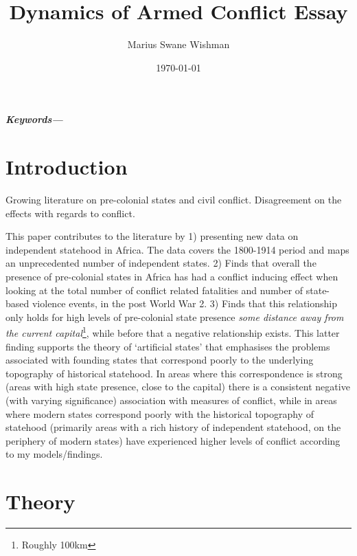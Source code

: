 \documentclass[12pt]{article}
\title{Dynamics of Armed Conflict Essay}
\author[1]{Marius Swane Wishman}
\affil[1]{Department of Sociology and Political Science, NTNU}
\date{\today}
\providecommand{\keywords}[1]
{
	\small	
	\textbf{\textit{Keywords---}} #1
}
\begin{document}
\maketitle

\begin{abstract}

\end{abstract}

\keywords{}


\onehalfspacing

\begin{multicols}{2}

\section{Introduction}

Growing literature on pre-colonial states and civil conflict. Disagreement on
the effects with regards to conflict.

This paper contributes to the literature by 1) presenting new data on
independent statehood in Africa. The data covers the 1800-1914 period and maps
an unprecedented number of independent states. 2) Finds that overall the
presence of pre-colonial states in Africa has had a conflict inducing effect
when looking at the total number of conflict related fatalities and number of
state-based violence events, in the post World War 2. 3) Finds that this
relationship only holds for high levels of pre-colonial state presence
\textit{some distance away from the current capital}\footnote{Roughly 100km},
while before that a negative relationship exists. This latter finding supports
the theory of `artificial states' that emphasises the problems associated with
founding states that correspond poorly to the underlying topography of
historical statehood. In areas where this correspondence is strong (areas with
high state presence, close to the capital) there is a consistent negative (with
varying significance) association with measures of conflict, while in areas
where modern states correspond poorly with the historical topography of
statehood (primarily areas with a rich history of independent statehood, on the
periphery of modern states) have experienced higher levels of conflict according
to my models/findings.

\section{Theory}


\end{multicols}
\end{document}
